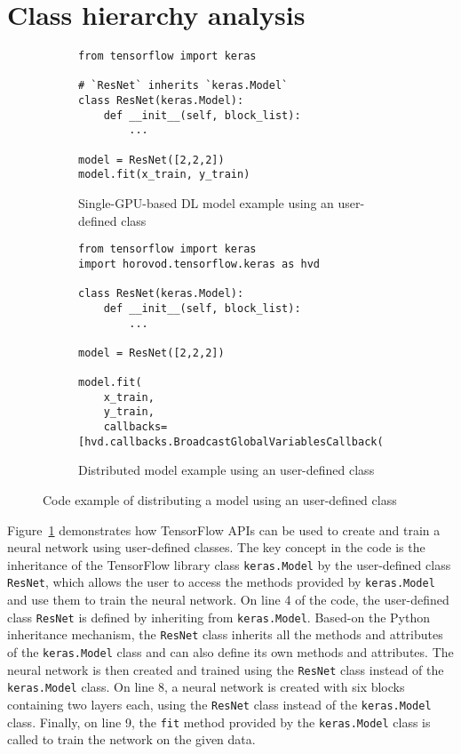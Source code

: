 \section{Class hierarchy analysis}\label{sec:cha}
\begin{figure}[!ht]
  \centering
  \begin{subfigure}[t]{0.35\textwidth}
    \begin{lstlisting}[style=mpython]
from tensorflow import keras

# `ResNet` inherits `keras.Model`
class ResNet(keras.Model):
    def __init__(self, block_list):
        ...

model = ResNet([2,2,2])
model.fit(x_train, y_train)\end{lstlisting}
    \caption{Single-GPU-based DL model example using an user-defined class}
    \label{fig:cha:tfex:a}
  \end{subfigure}
  \hspace{3mm}
  \begin{subfigure}[t]{0.6\textwidth}
    \begin{lstlisting}[style=mpython]
from tensorflow import keras
import horovod.tensorflow.keras as hvd

class ResNet(keras.Model):
    def __init__(self, block_list):
        ...

model = ResNet([2,2,2])

model.fit(
    x_train,
    y_train,
    callbacks=[hvd.callbacks.BroadcastGlobalVariablesCallback(0)])\end{lstlisting}
    \caption{Distributed model example using an user-defined class}
    \label{fig:cha:tfex:b}
  \end{subfigure}

  \caption{Code example of distributing a model using an user-defined class}
  \label{fig:cha:tfex}
\end{figure}

Figure~\ref{fig:cha:tfex:a} demonstrates how TensorFlow APIs can be used to
create and train a neural network using user-defined classes. 
The key concept in the code is the inheritance of the TensorFlow library class
{\tt keras.Model} by the user-defined class {\tt ResNet}, which allows the user
to access the methods provided by {\tt keras.Model} and use them to train the
neural network.
On line 4 of the code, the user-defined class {\tt ResNet} is defined by
inheriting from {\tt keras.Model}. 
Based-on the Python inheritance mechanism, the {\tt ResNet} class inherits all
the methods and attributes of the {\tt keras.Model} class and can also define
its own methods and attributes. 
The neural network is then created and trained using the {\tt ResNet} class
instead of the {\tt keras.Model} class. 
On line 8, a neural network is created with six blocks containing two layers
each, using the {\tt ResNet} class instead of the {\tt keras.Model} class.
Finally, on line 9, the {\tt fit} method provided by the {\tt keras.Model}
class is called to train the network on the given data.

